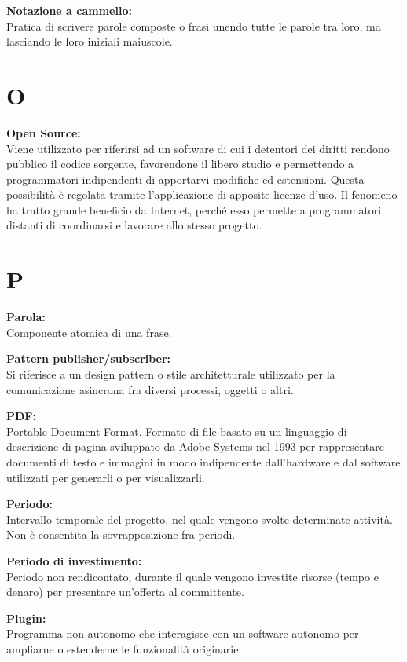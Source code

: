 \documentclass[a4paper, oneside, openany, dvipsnames, table]{article}
\begin{document}
\textbf{Notazione a cammello:}\\	Pratica di scrivere parole composte o frasi unendo tutte le parole tra loro, ma lasciando le loro iniziali maiuscole.

\newpage
\section{O}
\textbf{Open Source:}\\	Viene utilizzato per riferirsi ad un software di cui i detentori dei diritti rendono pubblico il codice sorgente, favorendone il libero studio e permettendo a programmatori indipendenti di apportarvi modifiche ed estensioni. Questa possibilità è regolata tramite l'applicazione di apposite licenze d'uso. Il fenomeno ha tratto grande beneficio da Internet, perché esso permette a programmatori distanti di coordinarsi e lavorare allo stesso progetto.

\newpage
\section{P}
\label{par:parola}
\textbf{Parola:}\\	Componente atomica di una frase.

\textbf{Pattern publisher/subscriber:}\\	 Si riferisce a un design pattern o stile architetturale utilizzato per la comunicazione asincrona fra diversi processi, oggetti o altri.

\textbf{PDF:}\\	Portable Document Format. Formato di file basato su un linguaggio di descrizione di pagina sviluppato da Adobe Systems nel 1993 per rappresentare documenti di testo e immagini in modo indipendente dall'hardware e dal software utilizzati per generarli o per visualizzarli.

\textbf{Periodo:}\\	Intervallo temporale del progetto, nel quale vengono svolte determinate attività. Non è consentita la sovrapposizione fra periodi.

\textbf{Periodo di investimento:}\\	Periodo non rendicontato, durante il quale vengono investite risorse (tempo e denaro) per presentare un'offerta al committente.

\textbf{Plugin:}\\	Programma non autonomo che interagisce con un software autonomo per ampliarne o estenderne le funzionalità originarie.
\end{document}
